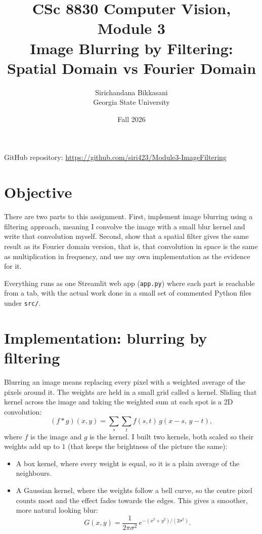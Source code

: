 \documentclass[11pt]{article}
\title{\vspace{-1.5em}CSc 8830 Computer Vision, Module 3\\[0.3em]
\large Image Blurring by Filtering: Spatial Domain vs Fourier Domain}
\author{Sirichandana Bikkasani \\ Georgia State University}
\date{Fall 2026}
\begin{document}
\maketitle

\noindent GitHub repository: \url{https://github.com/siri423/Module3-ImageFiltering}

\section{Objective}

There are two parts to this assignment. First, implement image blurring using a
filtering approach, meaning I convolve the image with a small blur kernel and
write that convolution myself. Second, show that a spatial filter gives the same
result as its Fourier domain version, that is, that convolution in space is the
same as multiplication in frequency, and use my own implementation as the
evidence for it.

Everything runs as one Streamlit web app (\texttt{app.py}) where each part is
reachable from a tab, with the actual work done in a small set of commented
Python files under \texttt{src/}.

\section{Implementation: blurring by filtering}

Blurring an image means replacing every pixel with a weighted average of the
pixels around it. The weights are held in a small grid called a kernel. Sliding
that kernel across the image and taking the weighted sum at each spot is a 2D
convolution:
\begin{equation}
(f * g)(x,y) = \sum_{s}\sum_{t} f(s,t)\, g(x-s,\, y-t),
\end{equation}
where $f$ is the image and $g$ is the kernel. I built two kernels, both scaled so
their weights add up to $1$ (that keeps the brightness of the picture the same):

\begin{itemize}
\item A box kernel, where every weight is equal, so it is a plain average of the
neighbours.
\item A Gaussian kernel, where the weights follow a bell curve, so the centre
pixel counts most and the effect fades towards the edges. This gives a smoother,
more natural looking blur:
\begin{equation}
G(x,y) = \frac{1}{2\pi\sigma^2}\, e^{-(x^2 + y^2)/(2\sigma^2)}.
\end{equation}
\end{itemize}
\end{document}
